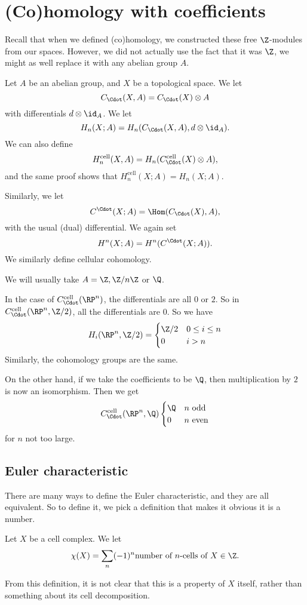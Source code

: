 \documentclass[a4paper]{article}
\begin{document}
\section{(Co)homology with coefficients}
Recall that when we defined (co)homology, we constructed these free $\Z$-modules from our spaces. However, we did not actually use the fact that it was $\Z$, we might as well replace it with any abelian group $A$.

\begin{defi}
  Let $A$ be an abelian group, and $X$ be a topological space. We let
  \[
    C_{\Cdot}(X, A) = C_\Cdot(X) \otimes A
  \]
  with differentials $d \otimes \id_A$. We let
  \[
    H_n(X; A) = H_n(C_{\Cdot}(X, A), d \otimes \id_A).
  \]
  We can also define
  \[
    H_n^{\mathrm{cell}}(X, A) = H_n(C_{\Cdot}^{\mathrm{cell}}(X) \otimes A),
  \]
  and the same proof shows that $H_n^{\mathrm{cell}}(X; A) = H_n(X; A)$.

  Similarly, we let
  \[
    C^{\Cdot}(X; A) = \Hom(C_{\Cdot}(X), A),
  \]
  with the usual (dual) differential. We again set
  \[
    H^n(X; A) = H^n(C^\Cdot(X; A)).
  \]
  We similarly define cellular cohomology.
\end{defi}
We will usually take $A = \Z, \Z/n\Z$ or $\Q$.

\begin{eg}
  In the case of $C_{\Cdot}^{\mathrm{cell}}(\RP^n)$, the differentials are all $0$ or $2$. So in $C_\Cdot^{\mathrm{cell}}(\RP^n, \Z/2)$, all the differentials are $0$. So we have
  \[
    H_i(\RP^n, \Z/2) =
    \begin{cases}
      \Z/2 & 0 \leq i \leq n\\
      0 & i > n
    \end{cases}
  \]
  Similarly, the cohomology groups are the same.

  On the other hand, if we take the coefficients to be $\Q$, then multiplication by $2$ is now an isomorphism. Then we get
  \[
    C_{\Cdot}^\mathrm{cell}(\RP^n, \Q)
    \begin{cases}
      \Q & n \text{ odd}\\
      0 & n\text{ even}
    \end{cases}
  \]
  for $n$ not too large.
\end{eg}

\subsection{Euler characteristic}
There are many ways to define the Euler characteristic, and they are all equivalent. So to define it, we pick a definition that makes it obvious it is a number.
\begin{defi}
  Let $X$ be a cell complex. We let
  \[
    \chi(X) = \sum_n (-1)^n \text{number of $n$-cells of $X$} \in \Z.
  \]
\end{defi}
From this definition, it is not clear that this is a property of $X$ itself, rather than something about its cell decomposition.
\end{document}
